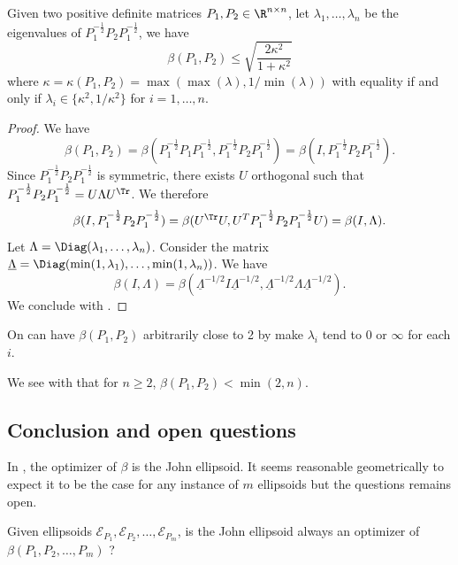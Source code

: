 \documentclass[11pt,twoside,a4paper,openright]{uclouvain-thesis}
\newcommand{\johnintm}{\beta}
\begin{document}
\begin{mytheo}
  \label{theo:johnintP1P2}
  Given two positive definite matrices $P_1, P_2 \in \R^{n \times n}$,
  let $\lambda_1, \ldots, \lambda_n$ be the eigenvalues of $P_1^{-\frac{1}{2}}P_2P_1^{-\frac{1}{2}}$, we have
  \[ \johnintm(P_1, P_2) \le \sqrt{\frac{2\kappa^2}{1+\kappa^2}} \]
  where $\kappa = \kappa(P_1, P_2) = \max(\max(\lambda), 1/\min(\lambda))$
  with equality if and only if $\lambda_i \in \{\kappa^2, 1/\kappa^2\}$ for $i = 1, \ldots, n$.
  \begin{proof}
    We have
    \[ \johnintm(P_1, P_2) = \johnintm(P_1^{-\frac{1}{2}}P_1P_1^{-\frac{1}{2}}, P_1^{-\frac{1}{2}}P_2P_1^{-\frac{1}{2}}) = \johnintm(I, P_1^{-\frac{1}{2}}P_2P_1^{-\frac{1}{2}}). \]
    Since $P_1^{-\frac{1}{2}}P_2P_1^{-\frac{1}{2}}$ is symmetric, there exists $U$ orthogonal such that $P_1^{-\frac{1}{2}}P_2P_1^{-\frac{1}{2}} = U \Lambda U^\Tr$.
    We therefore
    \[ \johnintm(I, P_1^{-\frac{1}{2}}P_2P_1^{-\frac{1}{2}}) = \johnintm(U^\Tr U, U^T P_1^{-\frac{1}{2}}P_2P_1^{-\frac{1}{2}} U) = \johnintm(I, \Lambda). \]
    Let $\Lambda = \Diag(\lambda_1, \ldots, \lambda_n)$.
    Consider the matrix $\underline{\Lambda} = \Diag(\min(1, \lambda_1), \ldots, \min(1, \lambda_n))$.
    We have
    \[ \johnintm(I, \Lambda) = \johnintm(\underline{\Lambda}^{-1/2}I\underline{\Lambda}^{-1/2}, \underline{\Lambda}^{-1/2}\Lambda\underline{\Lambda}^{-1/2}). \]
    We conclude with .


  \end{proof}
\end{mytheo}



\begin{myrem}
  On can have $\johnintm(P_1, P_2)$ arbitrarily close to 2 by make $\lambda_i$ tend to 0 or $\infty$ for each $i$.
\end{myrem}

We see with  that for $n \geq 2$, $\johnintm(P_1, P_2) < \min(2, n)$. %

\subsection{Conclusion and open questions}

In , the optimizer of $\johnintm$ is the John ellipsoid.
It seems reasonable geometrically to expect it to be the case for any instance
of $m$ ellipsoids but the questions remains open.

\begin{myopen}
  Given ellipsoids $\mathcal{E}_{P_1}, \mathcal{E}_{P_2}, \ldots, \mathcal{E}_{P_m}$,
  is the John ellipsoid always an optimizer of $\johnintm(P_1, P_2, \ldots, P_m)$ ?
\end{myopen}
\end{document}
